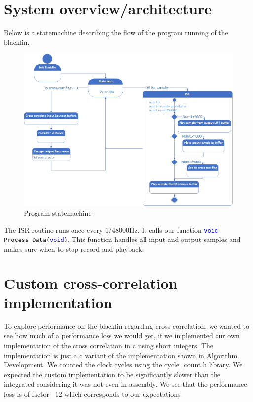 \section{System overview/architecture}
Below is a statemachine describing the flow of the program running of the blackfin.\\
\begin{figure}[H]
\centering
\includegraphics[width=1\textwidth]{billeder/code_statemachine}
\caption{Program statemachine}
\end{figure}
The ISR routine runs once every 1/48000Hz. It calls our function \texttt{\textcolor{blue}{void} Process\_Data(\textcolor{blue}{void})}. This function handles all input and output samples and makes sure when to stop record and playback.\\
\section{Custom cross-correlation implementation}
To explore performance on the blackfin regarding cross correlation, we wanted to see how much of a performance loss we would get, if we implemented our own implementation of the cross correlation in c using short integers. The implementation is just a c variant of the implementation shown in Algorithm Development. We counted the clock cycles using the cycle\_count.h library. We expected the custom implementation to be significantly slower than the integrated considering it was not even in assembly.
We see that the performance loss is of factor ~12 which corresponds to our expectations.

